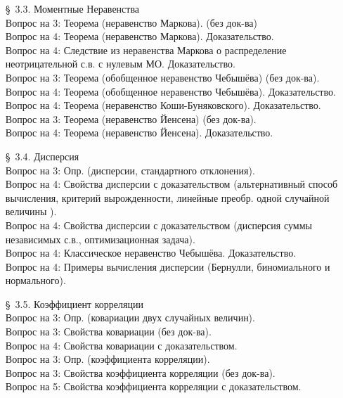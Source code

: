\documentclass[10pt]{amsart}
\begin{document}
\begin{enumerate}
\begin{enumerate}
\item[\S\, 3.3.] Моментные Неравенства \\
Вопрос на 3: Теорема (неравенство Маркова). (без док-ва) \\
 Вопрос на 4: Теорема (неравенство Маркова). Доказательство. \\
Вопрос на 4: Следствие из неравенства Маркова о распределение неотрицательной с.в. с нулевым МО. Доказательство. \\
Вопрос на 3: Теорема (обобщенное неравенство Чебышёва) (без док-ва). \\
Вопрос на 4: Теорема (обобщенное неравенство Чебышёва). Доказательство. \\
Вопрос на 4: Теорема (неравенство Коши-Буняковского). Доказательство. \\
Вопрос на 3: Теорема (неравенство Йенсена) (без док-ва). \\
Вопрос на 4: Теорема (неравенство Йенсена). Доказательство. \\

\item[\S\, 3.4.] Дисперсия \\
Вопрос на 3: Опр. (дисперсии, стандартного отклонения). \\ 
Вопрос на 4: Свойства дисперсии с доказательством (альтернативный способ вычисления, критерий вырожденности, линейные преобр. одной случайной величины ). \\ 
Вопрос на 4: Свойства дисперсии с доказательством (дисперсия суммы независимых с.в., оптимизационная задача). \\ 
Вопрос на 4: Классическое неравенство Чебышёва. Доказательство. \\
Вопрос на 4: Примеры вычисления дисперсии (Бернулли, биномиального и нормального). \\
 
        
        
\item[\S\, 3.5.] Коэффициент корреляции \\
Вопрос на 3: Опр. (ковариации двух случайных величин). \\
Вопрос на 3: Свойства ковариации (без док-ва). \\
Вопрос на 4: Свойства ковариации с доказательством. \\
Вопрос на 3: Опр. (коэффициента корреляции). \\
Вопрос на 3: Свойства коэффициента корреляции (без док-ва). \\
Вопрос на 5: Свойства коэффициента корреляции с доказательством. \\




\end{enumerate}
\end{enumerate}
\end{document}
